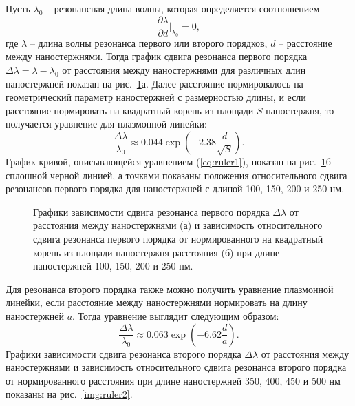 Пусть $ \lambda_0 $ -- резонансная длина волны, которая определяется соотношением
\begin{equation}
\dfrac{\partial \lambda}{\partial d} \Big|_{\lambda _0} = 0,
\end{equation}
где $ \lambda $ -- длина волны резонанса первого или второго порядков, $ d $ -- расстояние между наностержнями. Тогда график сдвига резонанса первого порядка $ \Delta \lambda =  \lambda - \lambda_0 $ от расстояния между наностержнями для различных длин наностержней показан на рис.~\ref{img:ruler1}а. Далее расстояние нормировалось на геометрический параметр наностержней с размерностью длины, и если расстояние нормировать на квадратный корень из площади $ S $ наностержня, то получается уравнение для плазмонной линейки:
\begin{equation}
\frac{\Delta \lambda}{\lambda_0} \approx 0.044 \exp \left( - 2.38 \frac{d}{\sqrt{S}} \right).
\label{eq:ruler1}
\end{equation}
График кривой, описывающейся уравнением (\ref{eq:ruler1}), показан на рис.~\ref{img:ruler1}б сплошной черной линией, а точками показаны положения относительного сдвига резонансов первого порядка для наностержней с длиной 100, 150, 200 и 250 нм.

\begin{figure}
\caption{Графики зависимости сдвига резонанса первого порядка $ \Delta \lambda $ от расстояния между наностержнями (а) и зависимость относительного сдвига резонанса первого порядка от нормированного на квадратный корень из площади наностержня расстояния (б) при длине наностержней 100, 150, 200 и 250 нм. }
\label{img:ruler1}
\end{figure}

Для резонанса второго порядка также можно получить уравнение плазмонной линейки, если расстояние между наностержнями нормировать на длину наностержней $ a $. Тогда уравнение выглядит следующим образом:
\begin{equation}
\frac{\Delta \lambda}{\lambda_0} \approx 0.063 \exp \left( - 6.62 \frac{d}{a} \right).
\end{equation}
Графики зависимости сдвига резонанса второго порядка $ \Delta \lambda $ от расстояния между наностержнями и зависимость относительного сдвига резонанса второго порядка от нормированного расстояния при длине наностержней 350, 400, 450 и 500 нм показаны на рис.~\ref{img:ruler2}.

